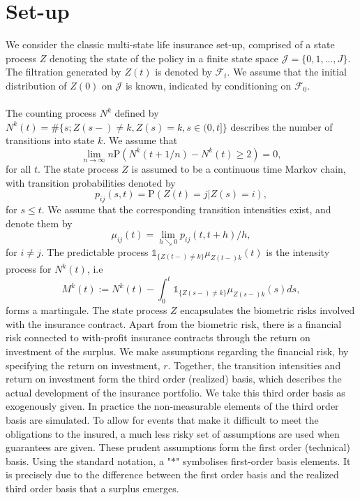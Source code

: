 \documentclass[12pt]{article}
\newcommand{\indic}[1]{\mathds{1}_{ \{ #1 \} }}
\renewcommand{\P}{\text{P}}
\theoremstyle{my_thm}
\theoremstyle{my_def}
\theoremstyle{my_thm2}
\begin{document}
\section*{Set-up}
We consider the classic multi-state life insurance set-up, comprised of a state process $Z$ denoting the state of the policy in a finite state space $\mathcal{J}=\{0,1,...,J\}$.  The filtration generated by $Z(t)$ is denoted by $\mathcal{F}_t$. We assume that the initial distribution of $Z(0)$ on $\mathcal{J}$ is known, indicated by conditioning on $\mathcal{F}_0$.
\\[12pt]
\noindent{}
\\[12pt]
The counting process $N^{k}$ defined by $N^{k}(t)=\# \{ s; Z(s-) \neq k, Z(s)=k, s \in (0,t] \}$ describes the number of transitions into state $k$. We assume that 
\begin{equation}
\lim_{n \rightarrow \infty} n \P( N^k(t+1/n) - N^k(t) \geq 2)=0, \label{eq:AAW}
\end{equation}
for all $t$. The state process $Z$ is assumed to be a continuous time Markov chain, with transition probabilities denoted by
$$
p_{ij}(s,t)= \P(Z(t)=j|Z(s)=i),
$$
for $s\leq t$. We assume that the corresponding transition intensities exist, and denote them by
$$
\mu_{ij}(t)=\lim_{h \searrow 0} p_{ij}(t,t+h)/h,
$$
for $i \neq j$. The predictable process $ \indic{Z(t-)\neq k }\mu_{Z(t-)k}(t)$ is the intensity process for $N^{k}(t)$, i.e
$$
M^{k}(t):=N^k(t)-\int_0^t \indic{Z(s-)\neq k } \mu_{Z(s-)k}(s) ds,
$$
forms a martingale. The state process $Z$ encapsulates the biometric risks involved with the insurance contract. Apart from the biometric risk, there is a financial risk connected to with-profit insurance contracts through the return on investment of the surplus. We make assumptions regarding the financial risk, by specifying the return on investment, $r$. Together, the transition intensities and return on investment form the third order (realized) basis, which describes the actual development of the insurance portfolio. We take this third order basis as exogenously given. In practice the non-measurable elements of the third order basis are simulated. To allow for events that make it difficult to meet the obligations to the insured, a much less risky set of assumptions are used when guarantees are given. These prudent assumptions form the first order (technical) basis. Using the standard notation, a "$*$" symbolises first-order basis elements. It is precisely due to the difference between the first order basis and the realized third order basis that a surplus emerges.
\end{document}
